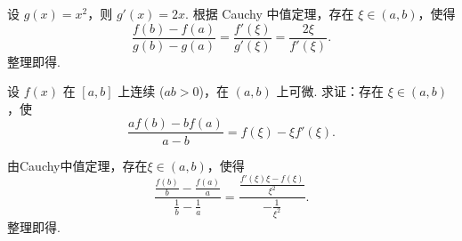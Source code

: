 \begin{solution}
    设 $g(x) = x^2$，则 $g'(x) = 2x$. 根据 Cauchy 中值定理，存在 $\xi \in (a, b)$，使得
    $$
        \frac{f(b) - f(a)}{g(b) - g(a)} = \frac{f'(\xi)}{g'(\xi)} = \frac{2\xi}{f'(\xi)}.
    $$
    整理即得.
\end{solution}

\begin{exercise}[3.4.4]
    设 $f(x)$ 在 $[a, b]$ 上连续 ($ab > 0$)，在 $(a, b)$ 上可微. 求证：存在 $\xi \in (a, b)$，使
    $$\frac{a f(b) - b f(a)}{a - b} = f(\xi) - \xi f'(\xi).$$
\end{exercise}

\begin{solution}
    由Cauchy中值定理，存在$\xi \in (a, b)$，使得
    $$\frac{ \frac{f(b)}{b} - \frac{f(a)}{a} }{ \frac{1}{b} - \frac{1}{a} } = \frac{\frac{f'(\xi)\xi - f(\xi)}{\xi^2}}{-\frac{1}{\xi^2}}.$$
    整理即得.
\end{solution}

